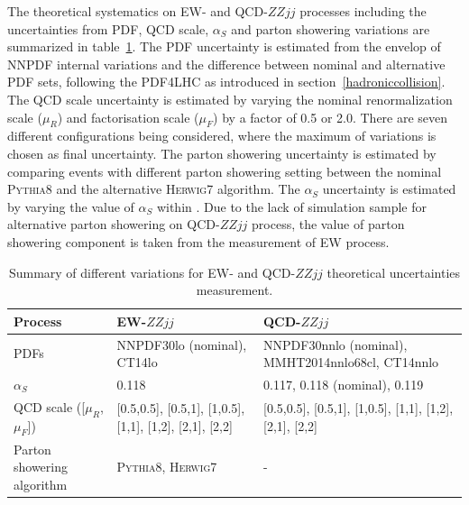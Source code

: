 The theoretical systematics on EW- and QCD-$ZZjj$ processes including the uncertainties from PDF, QCD scale, $\alpha_{S}$ and parton showering variations are summarized in table~\ref{tab:syst_theo_uncer}.
The PDF uncertainty is estimated from the envelop of NNPDF internal variations and the difference between nominal and alternative PDF sets, following the PDF4LHC as introduced in section~\ref{hadroniccollision}.
The QCD scale uncertainty is estimated by varying the nominal renormalization scale ($\mu_{R}$) and factorisation scale ($\mu_{F}$) by a factor of 0.5 or 2.0.
There are seven different configurations being considered, where the maximum of variations is chosen as final uncertainty.
The parton showering uncertainty is estimated by comparing events with different parton showering setting between the nominal \textsc{Pythia8} and the alternative \textsc{Herwig7}\cite{Bellm:2015jjp, Bahr:2008pv} algorithm.
The $\alpha_{S}$ uncertainty is estimated by varying the value of $\alpha_{S}$ within .
Due to the lack of simulation sample for alternative parton showering on QCD-$ZZjj$ process, 
the value of parton showering component is taken from the measurement of EW process.
\begin{table}[!htb]
\small
\begin{center}
\begin{tabular}{p{5cm}p{5cm}p{5cm}} 
\hline\hline
Process     & EW-$ZZjj$   & QCD-$ZZjj$ \\
\hline
PDFs        & NNPDF30lo (nominal), CT14lo & NNPDF30nnlo (nominal), MMHT2014nnlo68cl, CT14nnlo \\
\hline
$\alpha_{S}$ & 0.118 & 0.117, 0.118 (nominal), 0.119 \\
\hline
QCD scale ([$\mu_{R}$, $\mu_{F}$]) & [0.5,0.5], [0.5,1], [1,0.5], [1,1], [1,2], [2,1], [2,2] & [0.5,0.5], [0.5,1], [1,0.5], [1,1], [1,2], [2,1], [2,2] \\
\hline 
Parton showering algorithm & \textsc{Pythia8}, \textsc{Herwig7} & - \\
\hline\hline
\end{tabular}
\caption{
Summary of different variations for EW- and QCD-$ZZjj$ theoretical uncertainties measurement.
}
\label{tab:syst_theo_uncer}
\end{center}
\end{table}

